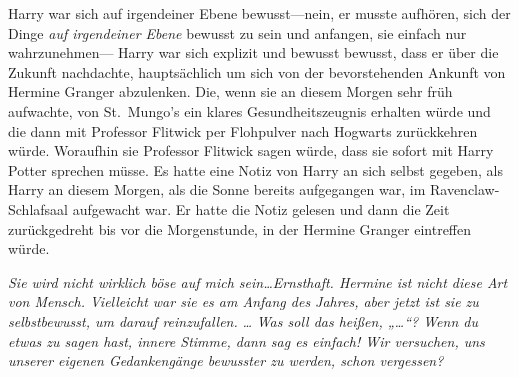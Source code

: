 Harry war sich auf irgendeiner Ebene bewusst—nein, er musste aufhören, sich der Dinge \emph{auf irgendeiner Ebene} bewusst zu sein und anfangen, sie einfach nur wahrzunehmen— Harry war sich explizit und bewusst bewusst, dass er über die Zukunft nachdachte, hauptsächlich um sich von der bevorstehenden Ankunft von Hermine Granger abzulenken. Die, wenn sie an diesem Morgen sehr früh aufwachte, von St.~Mungo’s ein klares Gesundheitszeugnis erhalten würde und die dann mit Professor Flitwick per Flohpulver nach Hogwarts zurückkehren würde. Woraufhin sie Professor Flitwick sagen würde, dass sie sofort mit Harry Potter sprechen müsse. Es hatte eine Notiz von Harry an sich selbst gegeben, als Harry an diesem Morgen, als die Sonne bereits aufgegangen war, im Ravenclaw-Schlafsaal aufgewacht war. Er hatte die Notiz gelesen und dann die Zeit zurückgedreht bis vor die Morgenstunde, in der Hermine Granger eintreffen würde.

\emph{Sie wird nicht wirklich böse auf mich sein…Ernsthaft. Hermine ist nicht diese Art von Mensch. Vielleicht war sie es am Anfang des Jahres, aber jetzt ist sie zu selbstbewusst, um darauf reinzufallen.}
\emph{…}
\emph{Was soll das heißen, „…“? Wenn du etwas zu sagen hast, innere Stimme, dann sag es einfach! Wir versuchen, uns unserer eigenen Gedankengänge bewusster zu werden, schon vergessen?}

\later

